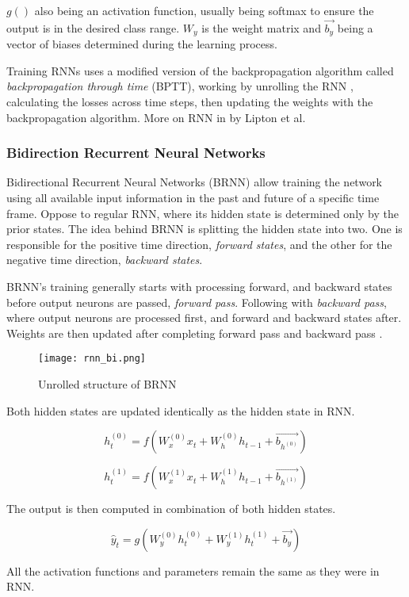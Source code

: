 $g()$ also being an activation function, usually being softmax to ensure the output is in the desired class range. $W_y$ is the weight matrix and $\vec{b_y}$ being a vector of biases determined during the learning process.

Training RNNs uses a modified version of the backpropagation algorithm called \textit{backpropagation through time} (BPTT), working by unrolling the RNN \cite{Goodfellow-et-al-2016}, calculating the losses across time steps, then updating the weights with the backpropagation algorithm. More on RNN in \cite{lipton2015critical} by Lipton et al.


\subsubsection{Bidirection Recurrent Neural Networks}


Bidirectional Recurrent Neural Networks (BRNN) allow training the network using all available input information in the past and future of a specific time frame. Oppose to regular RNN, where its hidden state is determined only by the prior states. The idea behind BRNN is splitting the hidden state into two. One is responsible for the positive time direction, \textit{forward states}, and the other for the negative time direction, \textit{backward states}.

BRNN’s training generally starts with processing forward, and backward states before output neurons are passed, \textit{forward pass}. Following with \textit{backward pass}, where output neurons are processed first, and forward and backward states after. Weights are then updated after completing forward pass and backward pass \cite{schusterbdrnn}.

\begin{figure}[h]
	\centering
    \texttt{[image: rnn\_bi.png]}
	\caption{Unrolled structure of BRNN \cite{matous}}
	\label{fig:brnn}
\end{figure}


Both hidden states are updated identically as the hidden state in RNN.

\begin{equation}
    {h_t^{(0)} = f(W_{x}^{(0)}x_t + W_{h}^{(0)}h_{t-1}+\vec{b_{h^{(0)}}})}
\end{equation}

\begin{equation}
    {h_t^{(1)} = f(W_{x}^{(1)}x_t + W_{h}^{(1)}h_{t-1}+\vec{b_{h^{(1)}}})}
\end{equation}

The output is then computed in combination of both hidden states.

\begin{equation}
    {\hat{y}_t = g(W_{y}^{(0)}h_t^{(0)} + W_{y}^{(1)}h_t^{(1)} + \vec{b_y})}
\end{equation}

All the activation functions and parameters remain the same as they were in RNN. 
